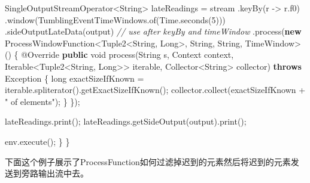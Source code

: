 \documentclass[cn,11pt,chinese]{elegantbook}
\newenvironment{Shaded}{}{}
\newcommand{\AttributeTok}[1]{\textcolor[rgb]{0.49,0.56,0.16}{#1}}
\newcommand{\BuiltInTok}[1]{#1}
\newcommand{\CommentTok}[1]{\textcolor[rgb]{0.38,0.63,0.69}{\textit{#1}}}
\newcommand{\DataTypeTok}[1]{\textcolor[rgb]{0.56,0.13,0.00}{#1}}
\newcommand{\DecValTok}[1]{\textcolor[rgb]{0.25,0.63,0.44}{#1}}
\newcommand{\FunctionTok}[1]{\textcolor[rgb]{0.02,0.16,0.49}{#1}}
\newcommand{\KeywordTok}[1]{\textcolor[rgb]{0.00,0.44,0.13}{\textbf{#1}}}
\newcommand{\NormalTok}[1]{#1}
\newcommand{\StringTok}[1]{\textcolor[rgb]{0.25,0.44,0.63}{#1}}
\begin{document}
\begin{Shaded}
\begin{Highlighting}[]
\NormalTok{        SingleOutputStreamOperator\textless{}}\BuiltInTok{String}\NormalTok{\textgreater{} lateReadings = stream}
\NormalTok{            .}\FunctionTok{keyBy}\NormalTok{(r {-}\textgreater{} r.}\FunctionTok{f0}\NormalTok{)}
\NormalTok{            .}\FunctionTok{window}\NormalTok{(TumblingEventTimeWindows.}\FunctionTok{of}\NormalTok{(}\BuiltInTok{Time}\NormalTok{.}\FunctionTok{seconds}\NormalTok{(}\DecValTok{5}\NormalTok{)))}
\NormalTok{            .}\FunctionTok{sideOutputLateData}\NormalTok{(output) }\CommentTok{// use after keyBy and timeWindow}
\NormalTok{            .}\FunctionTok{process}\NormalTok{(}\KeywordTok{new}\NormalTok{ ProcessWindowFunction\textless{}Tuple2\textless{}}\BuiltInTok{String}\NormalTok{, }\BuiltInTok{Long}\NormalTok{\textgreater{}, }\BuiltInTok{String}\NormalTok{, }\BuiltInTok{String}\NormalTok{, TimeWindow\textgreater{}() \{}
                \AttributeTok{@Override}
                \KeywordTok{public} \DataTypeTok{void} \FunctionTok{process}\NormalTok{(}\BuiltInTok{String}\NormalTok{ s, }\BuiltInTok{Context}\NormalTok{ context, }\BuiltInTok{Iterable}\NormalTok{\textless{}Tuple2\textless{}}\BuiltInTok{String}\NormalTok{, }\BuiltInTok{Long}\NormalTok{\textgreater{}\textgreater{} iterable, Collector\textless{}}\BuiltInTok{String}\NormalTok{\textgreater{} collector) }\KeywordTok{throws} \BuiltInTok{Exception}\NormalTok{ \{}
                    \DataTypeTok{long}\NormalTok{ exactSizeIfKnown = iterable.}\FunctionTok{spliterator}\NormalTok{().}\FunctionTok{getExactSizeIfKnown}\NormalTok{();}
\NormalTok{                    collector.}\FunctionTok{collect}\NormalTok{(exactSizeIfKnown + }\StringTok{" of elements"}\NormalTok{);}
\NormalTok{                \}}
\NormalTok{            \});}

\NormalTok{        lateReadings.}\FunctionTok{print}\NormalTok{();}
\NormalTok{        lateReadings.}\FunctionTok{getSideOutput}\NormalTok{(output).}\FunctionTok{print}\NormalTok{();}

\NormalTok{        env.}\FunctionTok{execute}\NormalTok{();}
\NormalTok{    \}}
\NormalTok{\}}
\end{Highlighting}
\end{Shaded}

下面这个例子展示了ProcessFunction如何过滤掉迟到的元素然后将迟到的元素发送到旁路输出流中去。
\end{document}
